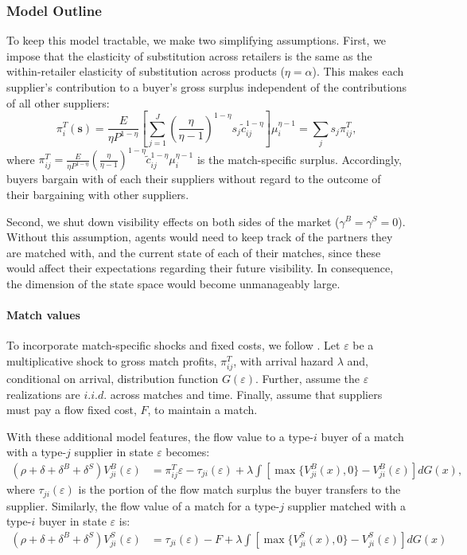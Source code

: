 \documentclass[12pt]{article} \usepackage{amsmath,amssymb,amsthm,geometry,graphicx,setspace,algorithm,algpseudocode,float}
\newcommand{\subsubsubsection}[1]{\paragraph{#1}}
\begin{document}
\subsubsection{Model Outline}

To keep this model tractable, we make two simplifying assumptions. First, we impose that the elasticity of substitution across retailers is the same as the  within-retailer elasticity of substitution across products ($\eta = \alpha$). This makes each supplier's contribution to a buyer's gross surplus independent of the contributions of all other suppliers: 
\begin{equation}
    \pi_i^T(\mathbf{s}) = \frac{E}{\eta P^{1-\eta}} \left[\sum_{j=1}^J \left(\frac{\eta}{\eta-1}\right)^{1-\eta} s_j \tilde{c}_{ij}^{1-\eta}\right]\mu_i^{\eta-1}  = \sum_j s_j \pi_{ij}^T,
\end{equation}
where $\pi_{ij}^T = \frac{E}{\eta P^{1-\eta}} \left(\frac{\eta}{\eta-1}\right)^{1-\eta} \tilde{c}_{ij}^{1-\eta}\mu_i^{\eta-1}$ is the match-specific surplus. Accordingly, buyers bargain with of each their suppliers without regard to the outcome of their bargaining with other suppliers. 
\par
Second, we shut down visibility effects on both sides of the market ($\gamma^B=\gamma^S=0$). Without this assumption, agents would need to keep track of the partners they are matched with, and the current state of each of their matches, since these would affect their expectations regarding their future visibility. In consequence, the dimension of the state space would become unmanageably large.

\subsubsubsection{Match values}

 To incorporate match-specific shocks and fixed costs, we follow \citet{MortensenPissarides1994}. Let $\varepsilon$ be a multiplicative shock to gross match profits, $\pi_{ij}^T$, with arrival hazard $\lambda$ and, conditional on arrival,  distribution function $G(\varepsilon)$. Further, assume the $\varepsilon$ realizations are $i.i.d.$ across matches and time. Finally, assume that suppliers must pay a flow fixed cost, $F$, to maintain a match. 
\par
With these additional model features, the flow value to a type-$i$ buyer of a  match with a type-$j$ supplier in state $\varepsilon$ becomes: 
\begin{align}
    (\rho + \delta + \delta^B + \delta^S)V_{ji}^B(\varepsilon) & = \pi_{ij}^T \varepsilon - \tau_{ji}(\varepsilon) + \lambda \int \left[\max \{V_{ji}^B(x),0 \} - V_{ji}^B(\varepsilon)\right] dG(x),
    \label{eq:surplus_B}
\end{align}
where  $\tau_{ji}(\varepsilon)$ is the portion of the flow match surplus the buyer transfers to the supplier. Similarly, the flow value of a match for a type-$j$ supplier matched with a type-$i$ buyer in state $\varepsilon$ is:
\begin{align}
    (\rho + \delta + \delta^B + \delta^S)V_{ji}^S(\varepsilon) & = \tau_{ji}(\varepsilon) - F  + \lambda \int \left[ \max \{ V_{ji}^S(x) , 0 \} - V_{ji}^S(\varepsilon) \right] dG(x)
    \label{eq:surplus_S}
\end{align}
\end{document}
